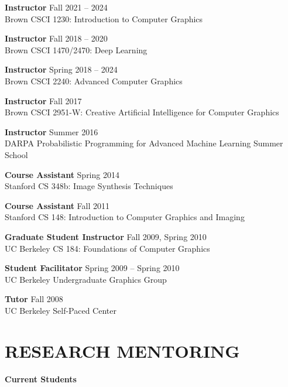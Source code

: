 \documentclass[line,margin]{res}
\begin{document}
\begin{resume}
\newcommand{\teach}[3] {
	\textbf{#1} \hfill #3\\
	#2
}

\teach
{Instructor}
{Brown CSCI 1230: Introduction to Computer Graphics}
{Fall 2021 -- 2024}

\teach
{Instructor}
{Brown CSCI 1470/2470: Deep Learning}
{Fall 2018 -- 2020}

\teach
{Instructor}
{Brown CSCI 2240: Advanced Computer Graphics}
{Spring 2018 -- 2024}

\teach
{Instructor}
{Brown CSCI 2951-W: Creative Artificial Intelligence for Computer Graphics}
{Fall 2017}

\teach
{Instructor}
{DARPA Probabilistic Programming for Advanced Machine Learning Summer School}
{Summer 2016}

\teach
{Course Assistant}
{Stanford CS 348b: Image Synthesis Techniques}
{Spring 2014}

\teach
{Course Assistant}
{Stanford CS 148: Introduction to Computer Graphics and Imaging}
{Fall 2011}

\teach
{Graduate Student Instructor}
{UC Berkeley CS 184: Foundations of Computer Graphics}
{Fall 2009, Spring 2010}

\teach
{Student Facilitator}
{UC Berkeley Undergraduate Graphics Group}
{Spring 2009 -- Spring 2010}

\teach
{Tutor}
{UC Berkeley Self-Paced Center}
{Fall 2008}


\section{RESEARCH MENTORING}

\newcommand{\currentphd}[2] {
	#1 \hfill #2
}

\newcommand{\student}[3] {
	#1 \hfill #2 (expected #3)
}

\newcommand{\alumni}[4] {
	#1 \hfill #2 #3\\
	\emph{Next position: #4}
}

\newcommand{\visitor}[4] {
	#1 \hfill #2 #3\\
	\emph{Home institution: #4}
}

\newcommand{\thesiscomm}[3] {
	#1 \hfill #2\\
	\emph{#3}
}


\textbf{Current Students}


\end{resume}
\end{document}
